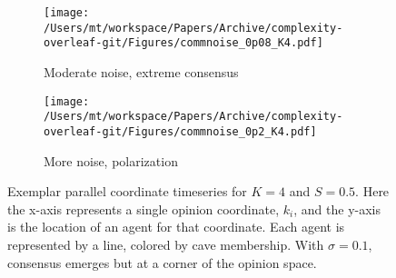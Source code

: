 \begin{figure}[H]
  \centering
    \begin{subfigure}[t]{0.48\textwidth}
      \centering
      \texttt{[image: /Users/mt/workspace/Papers/Archive/complexity-overleaf-git/Figures/commnoise\_0p08\_K4.pdf]}
      \caption{Moderate noise, extreme consensus}
    \end{subfigure}
    \begin{subfigure}[t]{0.48\textwidth}
      \centering
      \texttt{[image: /Users/mt/workspace/Papers/Archive/complexity-overleaf-git/Figures/commnoise\_0p2\_K4.pdf]}
      \caption{More noise, polarization}
    \end{subfigure} 
  \caption{Exemplar parallel coordinate timeseries for $K=4$ and $S=0.5$. 
    Here the x-axis represents a single opinion coordinate, $k_i$, and the 
    y-axis is the location of an agent for that coordinate. Each agent is
    represented by a line, colored by cave membership.
    With $\sigma=0.1$, 
    consensus emerges but at a corner of the opinion space. 
  }
  \label{fig:noiseCoordsS0p5K4}
\end{figure}

